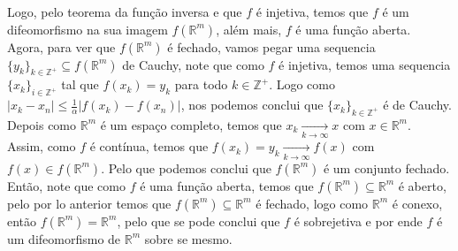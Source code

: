 \begin{homeworkProblem}[Seção 1-7]
\begin{solution}
    Logo, pelo teorema da função inversa e que $f$ é injetiva, temos que $f$ é um difeomorfismo na sua imagem $f\left( \mathbb{R}^{m} \right)$, além mais, $f$ é uma função aberta.\\ 
    Agora, para ver que $f\left( \mathbb{R}^{m} \right)$ é fechado, vamos pegar uma sequencia $\{y_k\}_{k\in\mathbb{Z}^{+}}\subseteq f\left( \mathbb{R}^{m} \right)$ de Cauchy, note que como $f$ é injetiva, temos uma sequencia $\{x_k\}_{i\in\mathbb{Z}^{+}}$ tal que $f(x_k)=y_k$ para todo $k\in\mathbb{Z}^{+}$. Logo como $\left| x_k-x_{n} \right|\leq \frac{1}{\alpha}\left| f(x_k)-f(x_{n}) \right|$, nos podemos conclui que $\{x_k\}_{k\in\mathbb{Z}^{+}}$ é de Cauchy. Depois como $\mathbb{R}^{m}$ é um espaço completo, temos que $x_k\xrightarrow[k\to\infty]{}x$ com $x\in\mathbb{R}^{m}$.\\
    Assim, como $f$ é contínua, temos que $f(x_k)=y_k\xrightarrow[k\to\infty]{}f(x)$ com $f(x)\in f\left( \mathbb{R}^{m} \right)$. Pelo que podemos conclui que $f\left( \mathbb{R}^{m} \right)$ é um conjunto fechado.\\
    Então, note que como $f$ é uma função aberta, temos que $f(\mathbb{R}^{m})\subseteq \mathbb{R}^{m}$ é aberto, pelo por lo anterior temos que $f\left( \mathbb{R}^{m} \right)\subseteq \mathbb{R}^{m}$ é fechado, logo como $\mathbb{R}^{m}$ é conexo, então $f(\mathbb{R}^{m})=\mathbb{R}^{m}$, pelo que se pode conclui que $f$ é sobrejetiva e por ende $f$ é um difeomorfismo de $\mathbb{R}^{m}$ sobre se mesmo.\\
  \end{solution}
\end{homeworkProblem}
